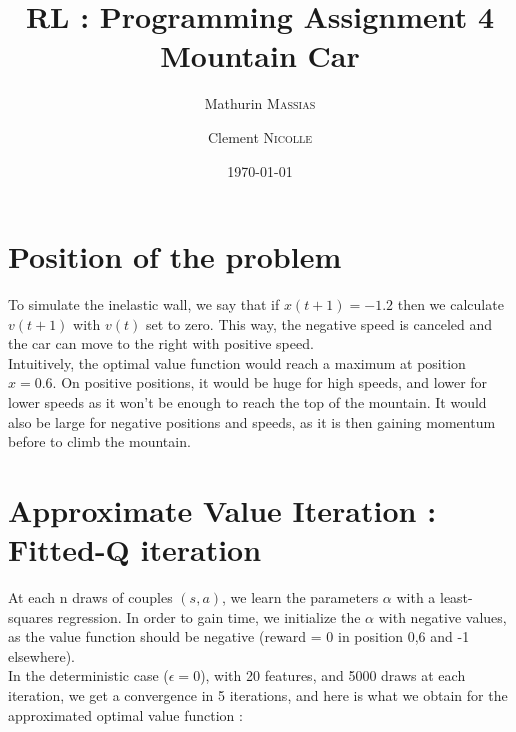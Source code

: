 \documentclass[a4paper, 12pt]{article}
\begin{document}
 
\title{RL : Programming Assignment 4\\Mountain Car}
\author{Mathurin \textsc{Massias} \and Clement \textsc{Nicolle}}
\date{\today} 
 
\maketitle

\section{Position of the problem}

To simulate the inelastic wall, we say that if $x(t+1) = -1.2$ then we calculate $v(t+1)$ with $v(t)$ set to zero. This way, the negative speed is canceled and the car can move to the right with positive speed.\\

Intuitively, the optimal value function would reach a maximum at position $x = 0.6$. On positive positions, it would be huge for high speeds, and lower for lower speeds as it won't be enough to reach the top of the mountain. It would also be large for negative positions and speeds, as it is then gaining momentum before to climb the mountain.

\section{Approximate Value Iteration : Fitted-Q iteration} 

At each n draws of couples $(s,a)$, we learn the parameters $\alpha$ with a least-squares regression. In order to gain time, we initialize the $\alpha$ with negative values, as the value function should be negative (reward = 0 in position 0,6 and -1 elsewhere).\\
In the deterministic case ($\epsilon = 0$), with 20 features, and 5000 draws at each iteration, we get a convergence in 5 iterations, and here is what we obtain for the approximated optimal value function :
\end{document}
